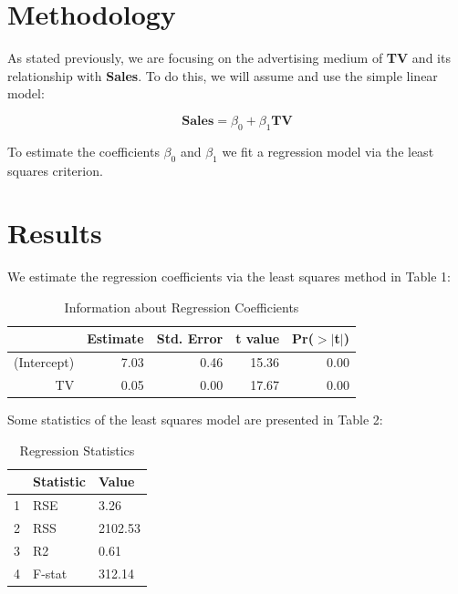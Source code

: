 \documentclass{article}
\begin{document}
\section*{Methodology}

As stated previously, we are focusing on the advertising medium of \textbf{TV} and its relationship with \textbf{Sales}. To do this, we will assume and use the simple linear model:

\begin{equation*}
\textbf{Sales} = \beta_0 + \beta_1 \textbf{TV}
\end{equation*}

To estimate the coefficients  $\beta_0$  and   $\beta_1$ we fit a regression model via the least squares criterion.



\section*{Results}

We estimate the regression coefficients via the least squares method in Table 1:






\begin{table}[ht]
\centering
\caption{Information about Regression Coefficients}
\begin{tabular}{rrrrr}
\hline
& Estimate & Std. Error & t value & Pr($>$$|$t$|$) \\
\hline
(Intercept) & 7.03 & 0.46 & 15.36 & 0.00 \\
TV & 0.05 & 0.00 & 17.67 & 0.00 \\
\hline
\end{tabular}
\end{table}


Some statistics of the least squares model are presented in Table 2:





\begin{table}[ht]
\centering
\caption{Regression Statistics}
\begin{tabular}{rll}
\hline
& Statistic & Value \\
\hline
1 & RSE & 3.26 \\
2 & RSS & 2102.53 \\
3 & R2 & 0.61 \\
4 & F-stat & 312.14 \\
\hline
\end{tabular}
\end{table}
\end{document}
